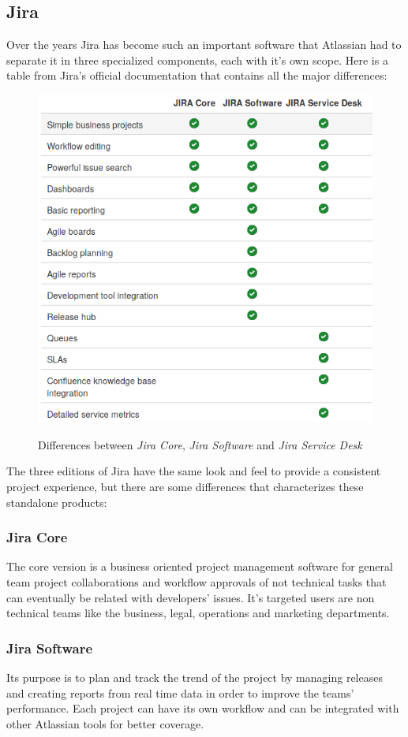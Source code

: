 	\subsection{Jira}
		Over the years Jira has become such an important software that Atlassian had to separate it in three specialized components, each with it's own scope.
		Here is a table from Jira's official documentation\cite{server_jira+jsd_product-changes} that contains all the major differences:
		\begin{figure}[H]
			\centering
			\includegraphics[width=.8\textwidth]{resources/jira_type}\\
			\caption{Differences between \textit{Jira Core}, \textit{Jira Software} and \textit{Jira Service Desk}}
		\end{figure}
		The three editions of Jira have the same look and feel to provide a consistent project experience, but there are some differences that characterizes these standalone products\cite{what-are-the-differences}:
		\subsubsection{Jira Core}
			The core version is a business oriented project management software for general team project collaborations and workflow approvals of not technical tasks that can eventually be related with developers' issues.
			It's targeted users are non technical teams like the business, legal, operations and marketing departments.
			
		\subsubsection{Jira Software}
			Its purpose is to plan and track the trend of the project by managing releases and creating reports from real time data in order to improve the teams' performance.
			Each project can have its own workflow and can be integrated with other Atlassian tools for better coverage.
		
